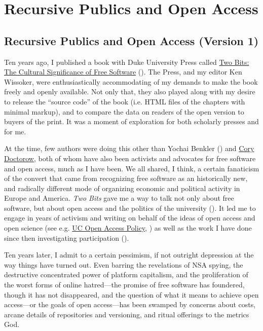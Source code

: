 \documentclass[11pt]{article}
\author{Christopher Kelty}
\date{\today}
\title{}
\begin{document}
\section*{Recursive Publics and Open Access}
\label{sec:org63c067c}
\subsection*{Recursive Publics and Open Access (Version 1)}
\label{sec:org11a6a90}
\maketitle
\onehalfspacing 

Ten years ago, I published a book with Duke University Press called \href{https://twobits.net/download/index.html}{Two Bits: The Cultural Significance of Free Software} (\cite{kelty2008twobits}). The Press, and my editor Ken Wissoker, were enthusiastically accommodating of my demands to make the book freely and openly available.  Not only that, they also played along with my desire to release the ``source code'' of the book (i.e. HTML files of the chapters with minimal markup), and to compare the data on readers of the open version to buyers of the print.  It was a moment of exploration for both scholarly presses and for me. 

At the time, few authors were doing this other than Yochai Benkler (\cite{benkler2007wealnetw}) and \href{https://craphound.com/}{Cory Doctorow}, both of whom have also been activists and advocates for free software and open access, much as I have been.  We all shared, I think, a certain fanaticism of the convert that came from recognizing free software as an historically new, and radically different mode of organizing economic and political activity in Europe and America. \emph{Two Bits} gave me a way to talk not only about free software, but about open access and the politics of the university (\cite{kelty2008anthincirc,kelty2014beyoncopytech}).  It led me to engage in years of activism and writing on behalf of the ideas of open access and open science (see e.g. \href{https://osc.universityofcalifornia.edu/open-access-policy/policy-history/}{UC Open Access Policy}, \cite{kelty_outlaw_2010}) as well as the work I have done since then investigating participation (\cite{fish2011birdinter,kelty2014sevendimen,kelty2018twomodespart}). 

Ten years later, I admit to a certain pessimism, if not outright depression at the way things have turned out.  Even barring the revelations of NSA spying, the destructive concentrated power of platform capitalism, and the proliferation of the worst forms of online hatred---the promise of free software has foundered, though it has not disappeared, and the question of what it means to achieve open access---or the goals of open access---has been swamped by concerns about costs, arcane details of repositories and versioning, and ritual offerings to the metrics God.  
\end{document}
